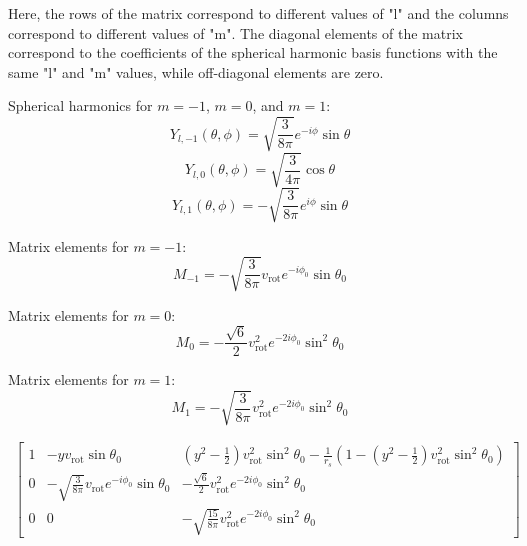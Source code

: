 \documentclass[modern]{aastex631}
\begin{document}
Here, the rows of the matrix correspond to different values of "l" and the columns correspond to different values of "m". 
The diagonal elements of the matrix correspond to the coefficients of the spherical harmonic basis functions with the same "l" and "m" values, 
while off-diagonal elements are zero.

Spherical harmonics for \(m = -1\), \(m = 0\), and \(m = 1\):
$$Y_{l,-1}(\theta, \phi) = \sqrt{\frac{3}{8\pi}}e^{-i\phi}\sin\theta$$
$$Y_{l,0}(\theta, \phi) = \sqrt{\frac{3}{4\pi}}\cos\theta$$
$$Y_{l,1}(\theta, \phi) = -\sqrt{\frac{3}{8\pi}}e^{i\phi}\sin\theta$$

Matrix elements for \(m = -1\):
$$M_{-1} = -\sqrt{\frac{3}{8\pi}}v_{\text{rot}}e^{-i\phi_0}\sin\theta_0$$

Matrix elements for \(m = 0\):
$$M_{0} = -\frac{\sqrt{6}}{2}v_{\text{rot}}^2e^{-2i\phi_0}\sin^2\theta_0$$

Matrix elements for \(m = 1\):
$$M_{1} = -\sqrt{\frac{3}{8\pi}}v_{\text{rot}}^2e^{-2i\phi_0}\sin^2\theta_0$$

\begin{multline}
    \begin{bmatrix}
        1 & -yv_{\text{rot}}\sin\theta_0 & (y^2 - \frac{1}{2})v_{\text{rot}}^2\sin^2\theta_0 - \frac{1}{r_s}(1 - (y^2 - \frac{1}{2})v_{\text{rot}}^2\sin^2\theta_0) \\
        0 & -\sqrt{\frac{3}{8\pi}}v_{\text{rot}}e^{-i\phi_0}\sin\theta_0 & -\frac{\sqrt{6}}{2}v_{\text{rot}}^2e^{-2i\phi_0}\sin^2\theta_0 \\
        0 & 0 & -\sqrt{\frac{15}{8\pi}}v_{\text{rot}}^2e^{-2i\phi_0}\sin^2\theta_0
    \end{bmatrix}
\end{multline}
\end{document}
